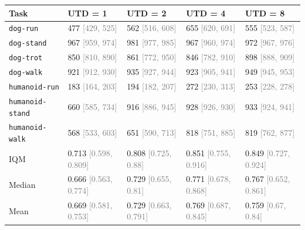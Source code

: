 \begin{tabular}{lllll}
\toprule
\textbf{Task} & \textbf{UTD = 1} & \textbf{UTD = 2} & \textbf{UTD = 4} & \textbf{UTD = 8} \\
\midrule
\texttt{dog-run} & 477 \textcolor{gray}{[429, 525]} & 562 \textcolor{gray}{[516, 608]} & 655 \textcolor{gray}{[620, 691]} & 555 \textcolor{gray}{[523, 587]} \\
\texttt{dog-stand} & 967 \textcolor{gray}{[959, 974]} & 981 \textcolor{gray}{[977, 985]} & 967 \textcolor{gray}{[960, 974]} & 972 \textcolor{gray}{[967, 976]} \\
\texttt{dog-trot} & 850 \textcolor{gray}{[810, 890]} & 861 \textcolor{gray}{[772, 950]} & 846 \textcolor{gray}{[782, 910]} & 898 \textcolor{gray}{[888, 909]} \\
\texttt{dog-walk} & 921 \textcolor{gray}{[912, 930]} & 935 \textcolor{gray}{[927, 944]} & 923 \textcolor{gray}{[905, 941]} & 949 \textcolor{gray}{[945, 953]} \\
\texttt{humanoid-run} & 183 \textcolor{gray}{[164, 203]} & 194 \textcolor{gray}{[182, 207]} & 272 \textcolor{gray}{[230, 313]} & 253 \textcolor{gray}{[228, 278]} \\
\texttt{humanoid-stand} & 660 \textcolor{gray}{[585, 734]} & 916 \textcolor{gray}{[886, 945]} & 928 \textcolor{gray}{[926, 930]} & 933 \textcolor{gray}{[924, 941]} \\
\texttt{humanoid-walk} & 568 \textcolor{gray}{[533, 603]} & 651 \textcolor{gray}{[590, 713]} & 818 \textcolor{gray}{[751, 885]} & 819 \textcolor{gray}{[762, 877]} \\
IQM & 0.713 \textcolor{gray}{[0.598, 0.809]} & 0.808 \textcolor{gray}{[0.725, 0.88]} & 0.851 \textcolor{gray}{[0.755, 0.916]} & 0.849 \textcolor{gray}{[0.727, 0.924]} \\
Median & 0.666 \textcolor{gray}{[0.563, 0.774]} & 0.729 \textcolor{gray}{[0.655, 0.81]} & 0.771 \textcolor{gray}{[0.678, 0.868]} & 0.767 \textcolor{gray}{[0.652, 0.861]} \\
Mean & 0.669 \textcolor{gray}{[0.581, 0.753]} & 0.729 \textcolor{gray}{[0.663, 0.791]} & 0.769 \textcolor{gray}{[0.687, 0.845]} & 0.759 \textcolor{gray}{[0.67, 0.84]} \\
\bottomrule
\end{tabular}
